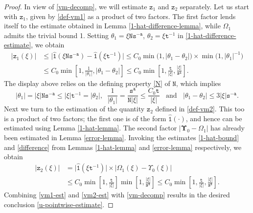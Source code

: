 \documentclass[12pt, twoside]{article}
\theoremstyle{definition}
\numberwithin{equation}{section}
\begin{document}
\begin{proof}
\vskip0.1in
\noindent In view of \eqref{vm-decomp}, we will estimate $\mathtt z_{1}$ and $\mathtt z_{2}$ separately. Let us start with $\mathtt z_{1}$, given by \eqref{def-vm1} as a product of two factors. The first factor lends itself to the estimate obtained in Lemma \ref{1-hat-difference-lemma}, while $\Omega_1$ admits the trivial bound 1. Setting  
$\theta_1 = \xi \mathtt N \mathtt s^{-\mathtt a}$, $\theta_2 = \xi \mathtt t^{-1}$ in \eqref{1-hat-difference-estimate}, we obtain 
\begin{align}
|\mathtt z_{1}(\xi) | &\leq \bigl| \widehat{\mathtt 1}(\xi \mathtt N \mathtt s^{-\mathtt a}) - \widehat{\mathtt 1}(\xi \mathtt t^{-1}) \bigr| \leq C_0 \min \bigl(1, |\theta_1-\theta_2|\bigr) \times \min \bigl(1, |\theta_1|^{-1} \bigr) \nonumber \\ 
&\leq C_0 \min \left[1, \frac{1}{|\theta_1|}, |\theta_1 - \theta_2| \right] \leq C_0  \min \left[1, \frac{\mathtt t}{|\xi|}, \frac{|\xi|}{\mathtt s^{\mathtt a}}\right]. \label{vm1-est}
\end{align}
The display above relies on the defining property \eqref{N} of $\mathtt N$, which implies  
\[ |\theta_1| = |\xi| \mathtt N \mathtt s^{-\mathtt a} \leq |\xi| \mathtt t^{-1} = |\theta_2|, \; \; \frac{1}{|\theta_1|} = \frac{\mathtt s^{\mathtt a}}{\mathtt N |\xi|} \leq \frac{C_0 \mathtt t}{|\xi|} \; \; \text{ and } \; \; |\theta_1 - \theta_2| \leq 3 |\xi| \mathtt s^{-\mathtt a}. \]
\vskip0.1in  
\noindent Next we turn to the estimation of the quantity $\mathtt z_{2}$ defined in \eqref{def-vm2}. This too is a product of two factors; the first one is of the form $\widehat{\mathtt 1}(\cdot)$, and hence can be estimated using Lemma \ref{1-hat-lemma}. The second factor  $|\pmb{\Upsilon}_0 - \Omega_1|$ has already been estimated in Lemma \ref{error-lemma}.
Invoking the estimates \eqref{1-hat-bound} and \eqref{difference} from Lemmas \ref{1-hat-lemma} and \ref{error-lemma} respectively, we obtain 
\begin{align} 
|\mathtt z_{2}(\xi)| &= \bigl| \widehat{\mathtt 1}(\xi \mathtt t^{-1}) \bigr| \times \bigl| \Omega_1 (\xi) - \Upsilon_{0}(\xi)\bigr| \nonumber \\
&\leq C_0 \min \left[1, \frac{\mathtt t}{|\xi|}\right] \min \left[1, \frac{|\xi|}{\mathtt s^{\mathtt a}}\right] \leq C_0  \min \left[1, \frac{\mathtt t}{|\xi|}, \frac{|\xi|}{\mathtt s^{\mathtt a}}\right]. \label{vm2-est}
\end{align} 
Combining \eqref{vm1-est} and \eqref{vm2-est} with \eqref{vm-decomp} results in the desired conclusion \eqref{u-pointwise-estimate}. 
\end{proof} 
\end{document}
